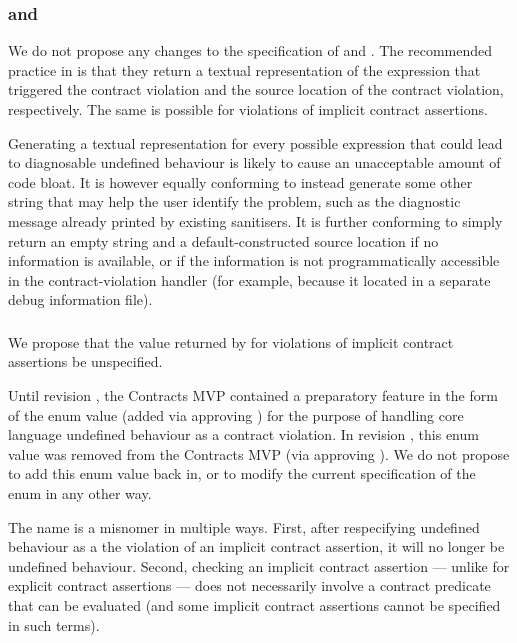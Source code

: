 \subsubsection{ and }
We do not propose any changes to the specification of  and . The recommended practice in \cite{P2900R7} is that they return a textual representation of the expression that triggered the contract violation and the source location of the contract violation, respectively. The same is possible for violations of implicit contract assertions.

Generating a textual representation for every possible expression that could lead to diagnosable undefined behaviour is likely to cause an unacceptable amount of code bloat. It is however equally conforming to instead generate some other string that may help the user identify the problem, such as the diagnostic message already printed by existing sanitisers. It is further conforming to simply return an empty string and a default-constructed source location if no information is available, or if the information is not programmatically accessible in the contract-violation handler (for example, because it located in a separate debug information file).

\subsubsection{}
We propose that the value returned by  for violations of implicit contract assertions be unspecified.

Until revision \cite{P2900R4}, the Contracts MVP contained a preparatory feature in the form of the enum value \mbox{} (added via approving \cite{P2811R7}) for the purpose of handling core language undefined behaviour as a contract violation. In revision \cite{P2900R5}, this enum value was removed from the Contracts MVP (via approving \cite{P3073R0}). We do not propose to add this enum value back in, or to modify the current specification of the  enum in any other way.

The name  is a misnomer in multiple ways. First, after respecifying undefined behaviour as a the violation of an implicit contract assertion, it will no longer be undefined behaviour. Second, checking an implicit contract assertion --- unlike for explicit contract assertions --- does not necessarily involve a contract predicate that can be evaluated (and some implicit contract assertions cannot be specified in such terms).

